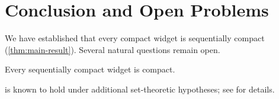 
\chapter{Conclusion and Open Problems}\label{cha:conclusion}

We have established that every compact widget is sequentially compact
(\cref{thm:main-result}).
Several natural questions remain open.

\begin{conjecture}\label{conj:converse}
  Every sequentially compact widget is compact.
\end{conjecture}

\begin{remark}\label{rem:counterexample}
   is known to hold under additional set-theoretic
  hypotheses; see \autocite{placeholder2025} for details.
\end{remark}

